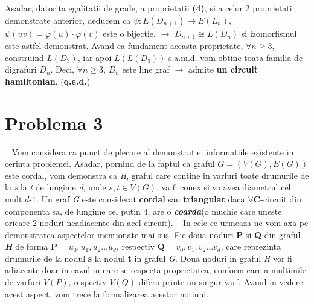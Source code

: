 \documentclass{article}
\begin{document}
\newline
Asadar, datorita egalitatii de grade, a proprietatii \textbf{(4)}, si a celor 2 proprietati demonstrate anterior, deducem ca $\psi: E(D_{n+1}) \rightarrow E(L_n)$, $\psi(uv)=\varphi(u) \cdot \varphi(v)$ este o bijectie.
\newline
\newline
$\rightarrow$  $D_{n+1} \cong L(D_n)$ si izomorfismul este astfel demonstrat.
\newline
Avand ca fundament aceasta proprietate, $\forall n \geq 3$, construind   $L(D_3)$, iar apoi $L(L(D_3))$ s.a.m.d. vom obtine toata familia de digrafuri $D_n$. Deci, $\forall n \geq 3$, $D_n$ este line graf $\rightarrow$ admite \textbf{un circuit hamiltonian}. (\textbf{q.e.d.})

\section{Problema 3}
\
\newline
\newline
Vom considera ca punct de plecare al demonstratiei informatiile existente in cerinta problemei. Asadar, pornind de la faptul ca graful $\textit{G}=(V(G), E(G))$ este cordal, vom demonstra ca \textit{H}, graful care contine in varfuri toate drumurile de la \textit{s} la \textit{t} de lungime \textit{d}, unde $s, t \in V(G)$, va fi conex si va avea diametrul cel mult $\textit{d-1}$. 
\newline
\newline
Un graf \textit{G} este considerat \textbf{cordal} sau \textbf{triangulat} daca $\forall  \textbf{C}$-circuit din componenta sa, de lungime cel putin 4, are o \textit{\textbf{coarda}}(o muchie care uneste oricare 2 noduri neadiacente din acel circuit). 
\
\newline
\newline
In cele ce urmeaza ne vom axa pe demonstrarea aspectelor mentionate mai sus.
Fie doua noduri \textbf{P} si \textbf{Q} din graful \textit{\textbf{H}} de forma $\textbf{P}=u_0, u_1, u_2...u_d$, respectiv $\textbf{Q}=v_0, v_1, v_2...v_d$, care reprezinta drumurile de la nodul \textbf{s} la nodul \textbf{t} in graful \textit{G}. Doua noduri in graful \textit{H} vor fi adiacente doar in cazul in care se respecta proprietatea, conform careia multimile de varfuri $V(P)$, respectiv $V(Q)$ difera printr-un singur varf. Avand in vedere acest aspect, vom trece la formalizarea acestor notiuni. 
\newline
\newline
\end{document}
